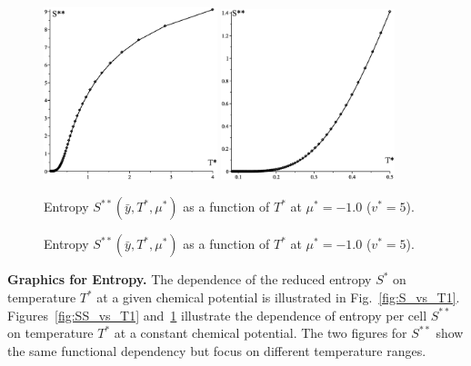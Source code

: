 \documentclass[12pt]{article}
\numberwithin{equation}{section}
\begin{document}
	\begin{figure}[htbp]
		\includegraphics[width=0.45\textwidth,angle=0]{SS_vs_T1}
		\hfill
		\includegraphics[width=0.45\textwidth,angle=0]{SS_vs_T2}
		\\
		\parbox{0.45\textwidth}{\caption{\label{fig:SS_vs_T1} Entropy $S^{**}(\bar{y},T^*,\mu^*)$ as a function of $T^*$ at $\mu^*=-1.0$ ($v^* = 5$).}}
		\hfill
		\parbox{0.45\textwidth}{\caption{\label{fig:SS_vs_T2} Entropy $S^{**}(\bar{y},T^*,\mu^*)$ as a function of $T^*$ at $\mu^*=-1.0$ ($v^* = 5$).}}
	\end{figure}
	
	\textbf{Graphics for Entropy.} The dependence of the reduced entropy $S^*$ on temperature $T^*$ at a given chemical potential is illustrated in Fig.~\ref{fig:S_vs_T1}. Figures~\ref{fig:SS_vs_T1} and~\ref{fig:SS_vs_T2} illustrate the dependence of entropy per cell $S^{**}$ on temperature $T^*$ at a constant chemical potential. The two figures for $S^{**}$ show the same functional dependency but focus on different temperature ranges.
	
\end{document}
